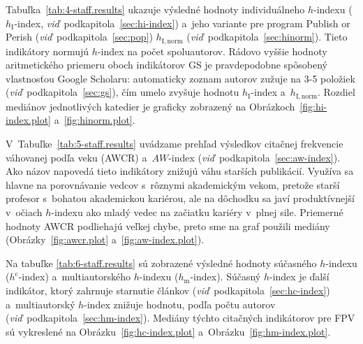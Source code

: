 Tabuľka~\ref{tab:4-staff.results} ukazuje výsledné hodnoty individuálneho
$h$-indexu ($h_{\mathrm{I}}$-index, \emph{viď}~podkapitola~\ref{sec:hi-index})
a~jeho variante pre program Publish or Perish
(\emph{viď}~podkapitola~\ref{sec:pop}) $h_{\mathrm{I,norm}}$
(\emph{viď}~podkapitola~\ref{sec:hinorm}).  Tieto indikátory normujú $h$-index
na počet spoluautorov.  Rádovo vyššie hodnoty aritmetického priemeru oboch
indikátorov GS je pravdepodobne spôsobený vlastnosťou Google Scholaru:
automaticky zoznam autorov zužuje na 3-5 položiek
(\emph{viď}~podkapitola~\ref{sec:gs}), čím umelo zvyšuje hodnotu
$h_{\mathrm{I}}$-index a~$h_{\mathrm{I,norm}}$.  Rozdiel mediánov jednotlivých
katedier je graficky zobrazený na Obrázkoch~\ref{fig:hi-index.plot}
a~\ref{fig:hinorm.plot}.

V~Tabuľke~\ref{tab:5-staff.results} uvádzame prehľad výsledkov citačnej
frekvencie váhovanej podľa veku (AWCR) a~$AW$-index
(\emph{viď}~podkapitola~\ref{sec:aw-index}).  Ako názov napovedá tieto
indikátory znižujú váhu starších publikácií.  Využíva sa hlavne na porovnávanie
vedcov s~rôznymi akademickým vekom, pretože starší profesor s~bohatou
akademickou kariérou, ale na dôchodku sa javí produktívnejší v~očiach $h$-indexu
ako mladý vedec na začiatku kariéry v~plnej sile.  Priemerné hodnoty AWCR
podliehajú veľkej chybe, preto sme na graf použili mediány
(Obrázky~\ref{fig:awcr.plot} a~\ref{fig:aw-index.plot}).

Na tabuľke \ref{tab:6-staff.results} sú zobrazené výsledné hodnoty súčasného
$h$-indexu ($h^{\mathrm{c}}$-index) a~multiautorského $h$-indexu
($h_{\mathrm{m}}$-index).  Súčasný $h$-index je ďalší indikátor, ktorý zahrnuje
starnutie článkov (\emph{viď}~podkapitola~\ref{sec:hc-index}) a~multiautorský
$h$-index znižuje hodnotu, podľa počtu autorov
(\emph{viď}~podkapitola~\ref{sec:hm-index}).  Mediány týchto citačných
indikátorov pre FPV sú vykreslené na Obrázku~\ref{fig:hc-index.plot}
a~Obrázku~\ref{fig:hm-index.plot}.

